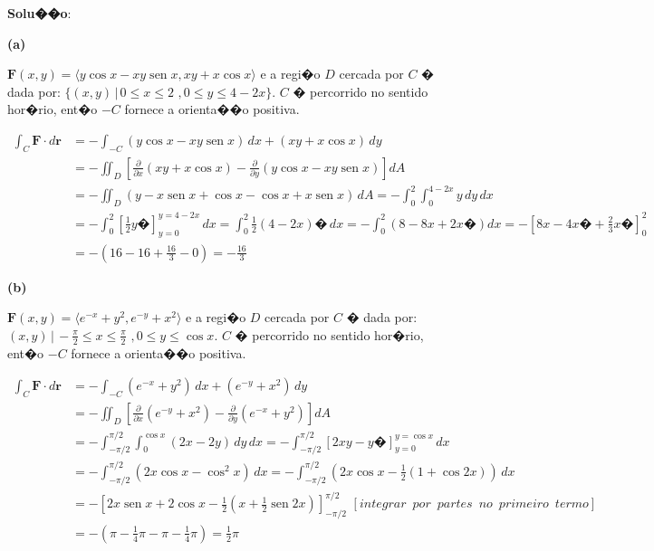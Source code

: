\documentclass[12pt]{article}
\DeclareMathOperator{\sen}{sen}
\begin{document}
\begin{enumerate}
          \textbf{Solu��o}:

          \textbf{(a)}

          $\textbf{F}(x,y)= \langle y\cos x - xy\sen x, xy + x\cos x \rangle $ e a regi�o $D$ cercada por $C$ � dada por: $\lbrace(x,y)\,|\,0\leq x \leq 2\,\, , 0 \leq y \leq 4-2x\rbrace$. $C$ � percorrido no sentido hor�rio, ent�o $-C$ fornece a orienta��o positiva.

          \begin{align*}
              \int_C \textbf{F}\cdot d\textbf{r} & = -\int_{-C} (y\cos x - xy\sen x)\,dx + (xy + x\cos x)\,dy \\& = - \iint_{D} \left[\frac{\partial}{\partial x}(xy + x\cos x) - \frac{\partial}{\partial y}(y\cos x - xy\sen x)\right]dA\\& = -\iint_{D} (y - x\sen x + \cos x - \cos x + x\sen x)\,dA = -\int_0^2 \int_0^{4-2x}y\,dy\,dx \\& = -\int_0^2 \left[\frac{1}{2}y� \right]_{y=0}^{y=4-2x}\,dx = \int_0^2 \frac{1}{2}(4-2x)�\,dx = -\int_0^2(8-8x+2x�)dx = - \left[8x-4x�+\frac{2}{3}x� \right]_0^2\\&= -\left(16-16+\frac{16}{3}-0\right)=-\frac{16}{3}
          \end{align*}

          \textbf{(b)}

          $\textbf{F}(x,y)= \langle e^{-x} + y^2, e^{-y} + x^2 \rangle $ e a regi�o $D$ cercada por $C$ � dada por: ${ (x,y)\,|\,-\frac{\pi}{2}\leq x \leq \frac{\pi}{2}\,\, , 0 \leq y \leq \cos x }$. $C$ � percorrido no sentido hor�rio, ent�o $-C$ fornece a orienta��o positiva.



          \begin{align*}
              \int_C \textbf{F}\cdot d\textbf{r} & = -\int_{-C} (e^{-x} + y^2)\,dx + (e^{-y} + x^2)\,dy \\& = - \iint_{D} \left[\frac{\partial}{\partial x}(e^{-y} + x^2) - \frac{\partial}{\partial y}(e^{-x} + y^2)\right]dA\\& = -\int_{-\pi/2}^{\pi/2} \int_0^{\cos x}(2x-2y)\,dy\,dx = -\int_{-\pi/2}^{\pi/2} \left[ 2xy - y� \right]_{y=0}^{y=\cos x}\,dx\\&= -\int_{-\pi/2}^{\pi/2}(2x \cos x - \cos^2 x)\,dx = -\int_{-\pi/2}^{\pi/2} \left(2x\cos x - \frac{1}{2}(1+ \cos 2x)\right)\,dx \\& = - \left[ 2x \sen x + 2 \cos x - \frac{1}{2}\left(x + \frac{1}{2} \sen 2x \right) \right]_{-\pi/2}^{\pi/2} \,\, [
                      integrar \,\,\, por\,\,\,partes\,\,\, no\,\,\, primeiro\,\,\, termo]              \\& = - \left(\pi - \frac{1}{4}\pi -\pi - \frac{1}{4}\pi\right)= \frac{1}{2}\pi
          \end{align*}



\end{enumerate}
\end{document}
